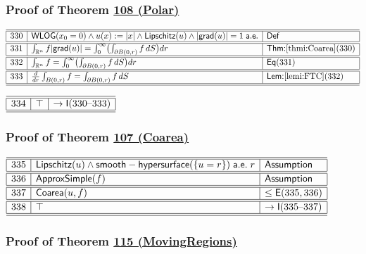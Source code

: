\documentclass[11pt,reqno]{amsart}
\begin{document}
\medskip

\subsubsection*{Proof of Theorem \hyperlink{thm:Polar}{108 (\textsf{Polar})}}

\noindent$%
\begin{array}{|r|l|l|}
\hline\hline
330 & \mathsf{WLOG}(x_{0}=0)\wedge u(x):=|x|\wedge\mathsf{Lipschitz}(u)\wedge|\mathsf{grad}(u)|=1\;\mathsf{a.e.} & \mathsf{Def} \\ \hline\hline
331 & \int_{\mathbb{R}^{n}}f|\mathsf{grad}(u)|=\int_{0}^{\infty}\bigl(\int_{\partial B(0,r)}f\,dS\bigr)dr & \textsf{Thm:}\ref{thmi:Coarea}(330) \\ \hline\hline
332 & \int_{\mathbb{R}^{n}}f=\int_{0}^{\infty}\bigl(\int_{\partial B(0,r)}f\,dS\bigr)dr & \mathsf{Eq}(331) \\ \hline\hline
333 & \frac{d}{dr}\int_{B(0,r)}f=\int_{\partial B(0,r)}f\,dS & \textsf{Lem:}\ref{lemi:FTC}(332) \\ \hline\hline
\end{array}%
$

\medskip

\noindent$%
\begin{array}{|r|l|l|}
\hline\hline
334 & \top & \to\mathsf{I}(330\text{--}333) \\ \hline\hline
\end{array}%
$

\medskip

\subsubsection*{Proof of Theorem \hyperlink{thm:Coarea}{107 (\textsf{Coarea})}}

\noindent$%
\begin{array}{|r|l|l|}
\hline\hline
335 & \mathsf{Lipschitz}(u)\wedge\mathsf{smooth-hypersurface}(\{u=r\})\;\mathsf{a.e.}\;r & \textsf{Assumption} \\ \hline\hline
336 & \mathsf{ApproxSimple}(f) & \textsf{Assumption} \\ \hline\hline
337 & \mathsf{Coarea}(u,f) & \le\mathsf{E}(335,336) \\ \hline\hline
338 & \top & \to\mathsf{I}(335\text{--}337) \\ \hline\hline
\end{array}%
$

\medskip

\subsubsection*{Proof of Theorem \hyperlink{thm:MovingRegions}{115 (\textsf{MovingRegions})}}
\end{document}
